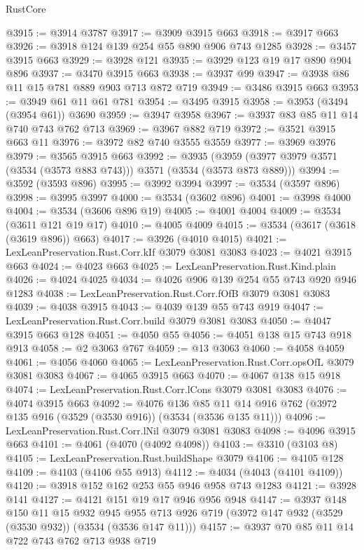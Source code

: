 \begin{lexlean}{RustCore}
\begin{coremodule}
@3915 := @3914 @3787
@3917 := @3909 @3915 @663
@3918 := @3917 @663
@3926 := @3918 @124 @139 @254 @55 @890 @906 @743 @1285
@3928 := @3457 @3915 @663
@3929 := @3928 @121
@3935 := @3929 @123 @19 @17 @890 @904 @896
@3937 := @3470 @3915 @663
@3938 := @3937 @99
@3947 := @3938 @86 @11 @15 @781 @889 @903 @713 @872 @719
@3949 := @3486 @3915 @663
@3953 := @3949 @61 @11 @61 @781
@3954 := @3495 @3915
@3958 := @3953 (@3494 (@3954 @61)) @3690
@3959 := @3947 @3958
@3967 := @3937 @83 @85 @11 @14 @740 @743 @762 @713
@3969 := @3967 @882 @719
@3972 := @3521 @3915 @663 @11
@3976 := @3972 @82 @740 @3555 @3559
@3977 := @3969 @3976
@3979 := @3565 @3915 @663
@3992 := @3935 (@3959 (@3977 @3979 @3571 (@3534 (@3573 @883 @743))) @3571 (@3534 (@3573 @873 @889)))
@3994 := @3592 (@3593 @896)
@3995 := @3992 @3994
@3997 := @3534 (@3597 @896)
@3998 := @3995 @3997
@4000 := @3534 (@3602 @896)
@4001 := @3998 @4000
@4004 := @3534 (@3606 @896 @19)
@4005 := @4001 @4004
@4009 := @3534 (@3611 @121 @19 @17)
@4010 := @4005 @4009
@4015 := @3534 (@3617 (@3618 (@3619 @896)) @663)
@4017 := @3926 (@4010 @4015)
@4021 := LexLeanPreservation.Rust.Corr.kIf @3079 @3081 @3083
@4023 := @4021 @3915 @663
@4024 := @4023 @663
@4025 := LexLeanPreservation.Rust.Kind.plain
@4026 := @4024 @4025
@4034 := @4026 @906 @139 @254 @55 @743 @920 @946 @1283
@4038 := LexLeanPreservation.Rust.Corr.fOfB @3079 @3081 @3083
@4039 := @4038 @3915
@4043 := @4039 @139 @55 @743 @919
@4047 := LexLeanPreservation.Rust.Corr.build @3079 @3081 @3083
@4050 := @4047 @3915 @663 @128
@4051 := @4050 @55
@4056 := @4051 @138 @15 @743 @918 @913
@4058 := @2 @3063 @767
@4059 := @13 @3063
@4060 := @4058 @4059
@4061 := @4056 @4060
@4065 := LexLeanPreservation.Rust.Corr.opsOfL @3079 @3081 @3083
@4067 := @4065 @3915 @663
@4070 := @4067 @138 @15 @918
@4074 := LexLeanPreservation.Rust.Corr.lCons @3079 @3081 @3083
@4076 := @4074 @3915 @663
@4092 := @4076
    @136
    @85
    @11
    @14
    @916
    @762
    (@3972 @135 @916 (@3529 (@3530 @916)) (@3534 (@3536 @135 @11)))
@4096 := LexLeanPreservation.Rust.Corr.lNil @3079 @3081 @3083
@4098 := @4096 @3915 @663
@4101 := @4061 (@4070 (@4092 @4098))
@4103 := @3310 (@3103 @8)
@4105 := LexLeanPreservation.Rust.buildShape @3079
@4106 := @4105 @128
@4109 := @4103 (@4106 @55 @913)
@4112 := @4034 (@4043 (@4101 @4109))
@4120 := @3918 @152 @162 @253 @55 @946 @958 @743 @1283
@4121 := @3928 @141
@4127 := @4121 @151 @19 @17 @946 @956 @948
@4147 := @3937
    @148
    @150
    @11
    @15
    @932
    @945
    @955
    @713
    @926
    @719
    (@3972 @147 @932 (@3529 (@3530 @932)) (@3534 (@3536 @147 @11)))
@4157 := @3937 @70 @85 @11 @14 @722 @743 @762 @713 @938 @719

\end{coremodule}
\end{lexlean}
